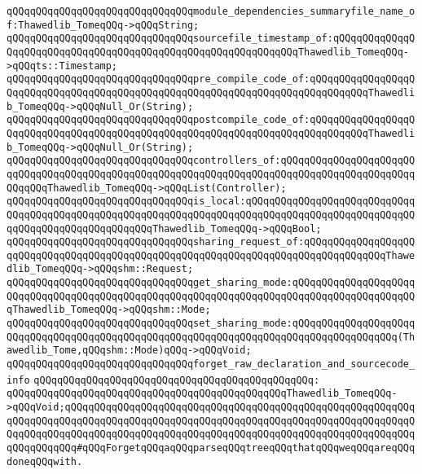 \newline
\verb|qQQqqQQqqQQqqQQqqQQqqQQqqQQqqQQqmodule_dependencies_summaryfile_name_of:Thawedlib_TomeqQQq->qQQqString;|\newline
\verb|qQQqqQQqqQQqqQQqqQQqqQQqqQQqqQQqsourcefile_timestamp_of:qQQqqQQqqQQqqQQqqQQqqQQqqQQqqQQqqQQqqQQqqQQqqQQqqQQqqQQqqQQqqQQqThawedlib_TomeqQQq->qQQqts::Timestamp;|\newline
\newline
\verb|qQQqqQQqqQQqqQQqqQQqqQQqqQQqqQQqpre_compile_code_of:qQQqqQQqqQQqqQQqqQQqqQQqqQQqqQQqqQQqqQQqqQQqqQQqqQQqqQQqqQQqqQQqqQQqqQQqqQQqqQQqThawedlib_TomeqQQq->qQQqNull_Or(String);|\newline
\verb|qQQqqQQqqQQqqQQqqQQqqQQqqQQqqQQqpostcompile_code_of:qQQqqQQqqQQqqQQqqQQqqQQqqQQqqQQqqQQqqQQqqQQqqQQqqQQqqQQqqQQqqQQqqQQqqQQqqQQqqQQqThawedlib_TomeqQQq->qQQqNull_Or(String);|\newline
\newline
\verb|qQQqqQQqqQQqqQQqqQQqqQQqqQQqqQQqcontrollers_of:qQQqqQQqqQQqqQQqqQQqqQQqqQQqqQQqqQQqqQQqqQQqqQQqqQQqqQQqqQQqqQQqqQQqqQQqqQQqqQQqqQQqqQQqqQQqqQQqqQQqThawedlib_TomeqQQq->qQQqList(Controller);|\newline
\newline
\verb|qQQqqQQqqQQqqQQqqQQqqQQqqQQqqQQqis_local:qQQqqQQqqQQqqQQqqQQqqQQqqQQqqQQqqQQqqQQqqQQqqQQqqQQqqQQqqQQqqQQqqQQqqQQqqQQqqQQqqQQqqQQqqQQqqQQqqQQqqQQqqQQqqQQqqQQqqQQqqQQqThawedlib_TomeqQQq->qQQqBool;|\newline
\verb|qQQqqQQqqQQqqQQqqQQqqQQqqQQqqQQqsharing_request_of:qQQqqQQqqQQqqQQqqQQqqQQqqQQqqQQqqQQqqQQqqQQqqQQqqQQqqQQqqQQqqQQqqQQqqQQqqQQqqQQqqQQqThawedlib_TomeqQQq->qQQqshm::Request;|\newline
\newline
\verb|qQQqqQQqqQQqqQQqqQQqqQQqqQQqqQQqget_sharing_mode:qQQqqQQqqQQqqQQqqQQqqQQqqQQqqQQqqQQqqQQqqQQqqQQqqQQqqQQqqQQqqQQqqQQqqQQqqQQqqQQqqQQqqQQqqQQqThawedlib_TomeqQQq->qQQqshm::Mode;|\newline
\verb|qQQqqQQqqQQqqQQqqQQqqQQqqQQqqQQqset_sharing_mode:qQQqqQQqqQQqqQQqqQQqqQQqqQQqqQQqqQQqqQQqqQQqqQQqqQQqqQQqqQQqqQQqqQQqqQQqqQQqqQQqqQQqqQQq(Thawedlib_Tome,qQQqshm::Mode)qQQq->qQQqVoid;|\newline
\newline
\verb|qQQqqQQqqQQqqQQqqQQqqQQqqQQqqQQqforget_raw_declaration_and_sourcecode_info|\newline
\verb|qQQqqQQqqQQqqQQqqQQqqQQqqQQqqQQqqQQqqQQqqQQqqQQq:|\newline
\verb|qQQqqQQqqQQqqQQqqQQqqQQqqQQqqQQqqQQqqQQqqQQqqQQqThawedlib_TomeqQQq->qQQqVoid;qQQqqQQqqQQqqQQqqQQqqQQqqQQqqQQqqQQqqQQqqQQqqQQqqQQqqQQqqQQqqQQqqQQqqQQqqQQqqQQqqQQqqQQqqQQqqQQqqQQqqQQqqQQqqQQqqQQqqQQqqQQqqQQqqQQqqQQqqQQqqQQqqQQqqQQqqQQqqQQqqQQqqQQqqQQqqQQqqQQqqQQqqQQqqQQqqQQqqQQqqQQqqQQqqQQq#qQQqForgetqQQqaqQQqparseqQQqtreeqQQqthatqQQqweqQQqareqQQqdoneqQQqwith.|\newline
